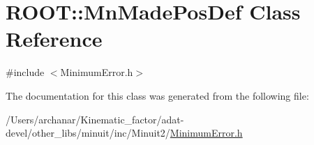 \hypertarget{classROOT_1_1Minuit2_1_1MinimumError_1_1MnMadePosDef}{}\section{R\+O\+OT\+:\+:Mn\+Made\+Pos\+Def Class Reference}
\label{classROOT_1_1Minuit2_1_1MinimumError_1_1MnMadePosDef}


{\ttfamily \#include $<$Minimum\+Error.\+h$>$}



The documentation for this class was generated from the following file\+:\begin{DoxyCompactItemize}
\item 
/\+Users/archanar/\+Kinematic\+\_\+factor/adat-\/devel/other\+\_\+libs/minuit/inc/\+Minuit2/\mbox{\hyperlink{adat-devel_2other__libs_2minuit_2inc_2Minuit2_2MinimumError_8h}{Minimum\+Error.\+h}}\end{DoxyCompactItemize}

